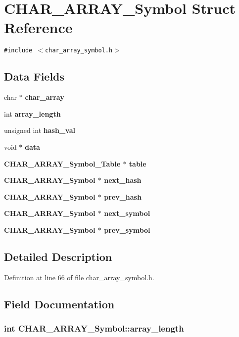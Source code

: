 \section{CHAR\_\-ARRAY\_\-Symbol Struct Reference}
\label{structCHAR__ARRAY__Symbol}
{\tt \#include $<$char\_\-array\_\-symbol.h$>$}

\subsection*{Data Fields}
\begin{CompactItemize}
\item 
char $\ast$ \bf{char\_\-array}
\item 
int \bf{array\_\-length}
\item 
unsigned int \bf{hash\_\-val}
\item 
void $\ast$ \bf{data}
\item 
\bf{CHAR\_\-ARRAY\_\-Symbol\_\-Table} $\ast$ \bf{table}
\item 
\bf{CHAR\_\-ARRAY\_\-Symbol} $\ast$ \bf{next\_\-hash}
\item 
\bf{CHAR\_\-ARRAY\_\-Symbol} $\ast$ \bf{prev\_\-hash}
\item 
\bf{CHAR\_\-ARRAY\_\-Symbol} $\ast$ \bf{next\_\-symbol}
\item 
\bf{CHAR\_\-ARRAY\_\-Symbol} $\ast$ \bf{prev\_\-symbol}
\end{CompactItemize}


\subsection{Detailed Description}




Definition at line 66 of file char\_\-array\_\-symbol.h.

\subsection{Field Documentation}
\subsubsection{\setlength{\rightskip}{0pt plus 5cm}int \bf{CHAR\_\-ARRAY\_\-Symbol::array\_\-length}}\label{structCHAR__ARRAY__Symbol_05169b3bf3d0ff53495c8a9d5865aba1}





